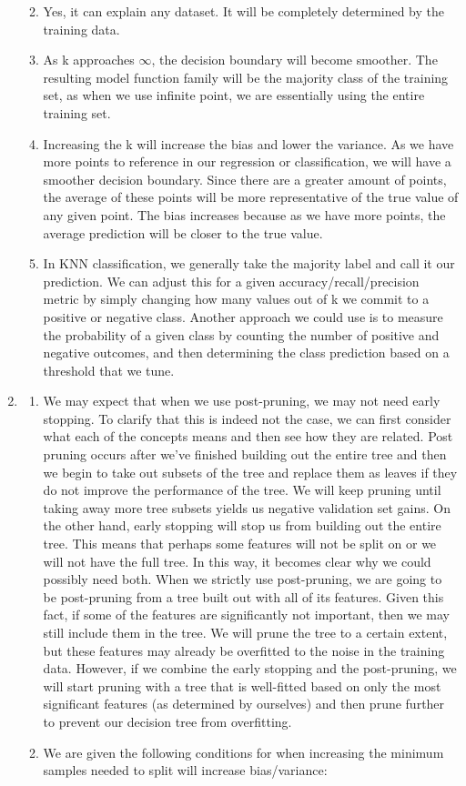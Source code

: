 \documentclass[12pt]{article}
\begin{document}
\begin{enumerate}
\begin{enumerate}
\begin{figure}[H]
\end{figure}
\item Yes, it can explain any dataset. It will be completely determined by the training data. 
\item As k approaches $\infty$, the decision boundary will become smoother. The resulting model function family will be the majority class of the training set, as when we use infinite point, we are essentially using the entire training set. 
\item Increasing the k will increase the bias and lower the variance. As we have more points to reference in our regression or classification, we will have a smoother decision boundary. Since there are a greater amount of points, the average of these points will be more representative of the true value of any given point. The bias increases because as we have more points, the average prediction will be closer to the true value. 
\item In KNN classification, we generally take the majority label and call it our prediction. We can adjust this for a given accuracy/recall/precision metric by simply changing how many values out of k we commit to a positive or negative class. Another approach we could use is to measure the probability of a given class by counting the number of positive and negative outcomes, and then determining the class prediction based on a threshold that we tune. 
\end{enumerate}

\item
  \begin{enumerate}
  \item We may expect that when we use post-pruning, we may not need early stopping. To clarify that this is indeed not the case, we can first consider what each of the concepts means and then see how they are related. Post pruning 
  occurs after we've finished building out the entire tree and then we begin to take out subsets of the tree and replace them as leaves if they do not improve the performance of the tree. We will keep pruning until taking away more tree subsets yields us negative validation set gains. On the other hand, early stopping will stop us from 
  building out the entire tree. This means that perhaps some features will not be split on or we will not have the full tree. In this way, it becomes clear why we could possibly need both. When we strictly use post-pruning, we are going to be post-pruning from a tree built out with all of its features. Given this fact, if some of the features are significantly not important, then we may still include them in the tree. We will prune the tree to a certain extent, but these features may already be overfitted to the noise in the training data. However, if we combine the early stopping and the post-pruning, we will start pruning with a tree that is well-fitted based on only the most significant features (as determined by ourselves) and then prune further to prevent our decision tree from overfitting.
  \item We are given the following conditions for when increasing the minimum samples needed to split will increase bias/variance: 
  

\end{enumerate}
\end{enumerate}
\end{document}
